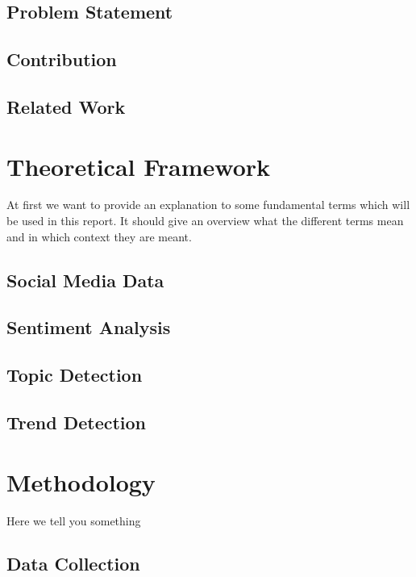 \documentclass[11pt,titlepage,oneside,openany]{book}
\begin{document}
 
\section{Problem Statement}
 

\section{Contribution}


\section{Related Work}



\chapter{Theoretical Framework}
\label{cha:theory}

At first we want to provide an explanation to some fundamental terms which will be used in this report. It should give an overview what the different terms mean and in which context they are meant.

\section{Social Media Data}
\label{sec:socmediadat}



\section{Sentiment Analysis}
\label{sec:sentana}


\section{Topic Detection}
\label{sec:topdec}

\section{Trend Detection}
\label{sec:trenddec}


\chapter{Methodology}
\label{cha:methodology}

Here we tell you something

\section{Data Collection}
\label{sec:datacoll}
\end{document}
